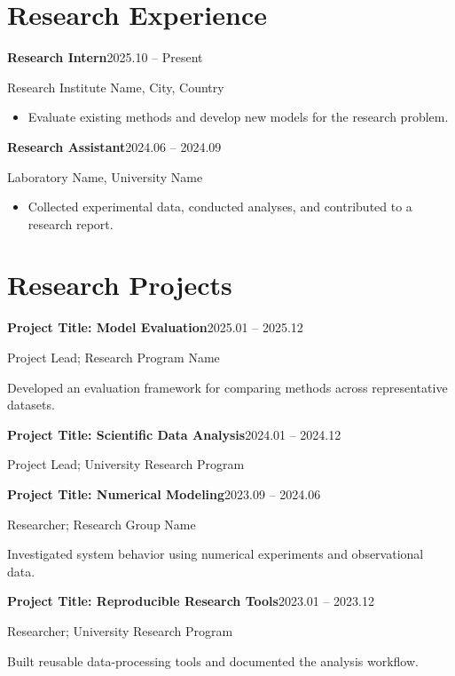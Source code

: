 \documentclass[a4paper,10pt]{article}
\begin{document}
\section*{Research Experience}
\textbf{Research Intern}\hfill 2025.10 -- Present\par
\hspace*{1em}Research Institute Name, City, Country\par
\begin{itemize}[leftmargin=1.8em,topsep=1pt,itemsep=1.5pt,parsep=0pt,partopsep=0pt]
  \item Evaluate existing methods and develop new models for the research problem.
\end{itemize}
\textbf{Research Assistant}\hfill 2024.06 -- 2024.09\par
\hspace*{1em}Laboratory Name, University Name\par
\begin{itemize}[leftmargin=1.5em,topsep=2pt,itemsep=2pt,parsep=0pt,partopsep=0pt]
  \item Collected experimental data, conducted analyses, and contributed to a research report.
\end{itemize}

\section*{Research Projects}
\textbf{Project Title: Model Evaluation}\hfill 2025.01 -- 2025.12\par
\hspace*{1em}Project Lead; Research Program Name\par
\hspace*{1em}Developed an evaluation framework for comparing methods across representative datasets.\par
\textbf{Project Title: Scientific Data Analysis}\hfill 2024.01 -- 2024.12\par
\hspace*{1em}Project Lead; University Research Program\par
\textbf{Project Title: Numerical Modeling}\hfill 2023.09 -- 2024.06\par
\hspace*{1em}Researcher; Research Group Name\par
\hspace*{1em}Investigated system behavior using numerical experiments and observational data.\par
\textbf{Project Title: Reproducible Research Tools}\hfill 2023.01 -- 2023.12\par
\hspace*{1em}Researcher; University Research Program\par
\hspace*{1em}Built reusable data-processing tools and documented the analysis workflow.\par
\end{document}
